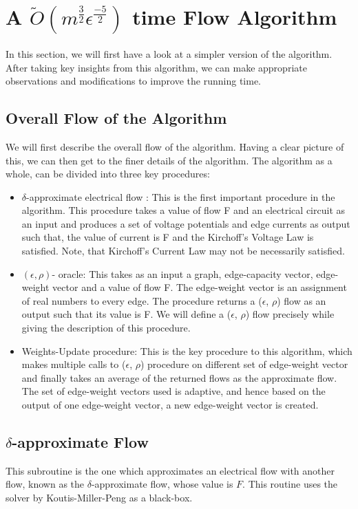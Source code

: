 \documentclass[BTech]{iitmdiss}
\begin{document}
	\section{A $\widetilde{O}(m^{\frac{3}{2}}\epsilon^{\frac{-5}{2}})$ time Flow Algorithm}
	  In this section, we will first have a look at a simpler version of the algorithm. After taking key insights from this algorithm,
	  we can make appropriate observations and modifications to improve the running time. \\
	  
	  \subsection{Overall Flow of the Algorithm}
	    We will first describe the overall flow of the algorithm. Having a clear picture of this, we can then get to the finer details of the 
	    algorithm. The algorithm as a whole, can be divided into three key procedures:
	    \begin{itemize}
	     \item 
		$\delta$-approximate electrical flow : This is the first important procedure in the algorithm. This procedure takes a value of flow 
		F and an electrical circuit as an input and produces a set of voltage potentials and edge currents as output such that, the value of
		current is F and the Kirchoff's Voltage Law is satisfied. Note, that Kirchoff's Current Law may not be necessarily satisfied.
	      \item
		$(\epsilon,\rho)$- oracle: This takes as an input a graph, edge-capacity vector, edge-weight vector and a value of flow F. The edge-weight vector is 
		an assignment of real numbers to every edge. The procedure returns a ($\epsilon$, $\rho$) flow as an output such that its value is F.
		We will define a ($\epsilon$, $\rho$) flow precisely while giving the description of this procedure.
	      \item
		Weights-Update procedure: This is the key procedure to this algorithm, which makes multiple calls to ($\epsilon$, $\rho$) procedure on
		different set of edge-weight vector and finally takes an average of the returned flows as the approximate flow. The set of edge-weight
		vectors used is adaptive, and hence based on the output of one edge-weight vector, a new edge-weight vector is created.
	    \end{itemize}

	  \subsection{$\delta$-approximate Flow}
	    This subroutine is the one which approximates an electrical flow with another flow, known as the $\delta$-approximate flow, whose value is
	    $F$. This routine uses the solver by Koutis-Miller-Peng as a black-box.
	    
\end{document}
